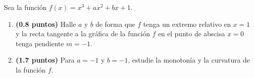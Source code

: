 
Sea la función $f(x)=x^3+ax^2+bx+1$.
\begin{enumerate}[label=\alph*)]
  \item \textbf{(0.8 puntos)} Halle $a$ y $b$ de forma que $f$ tenga un
  extremo relativo en $x=1$ y la recta tangente a la gráfica de la función $f$
  en el punto de abscisa $x=0$ tenga pendiente $m=-1$.
  \item \textbf{(1.7 puntos)} Para $a=-1$ y $b=-1$, estudie la monotonía y
  la curvatura de la función $f$.
\end{enumerate}
